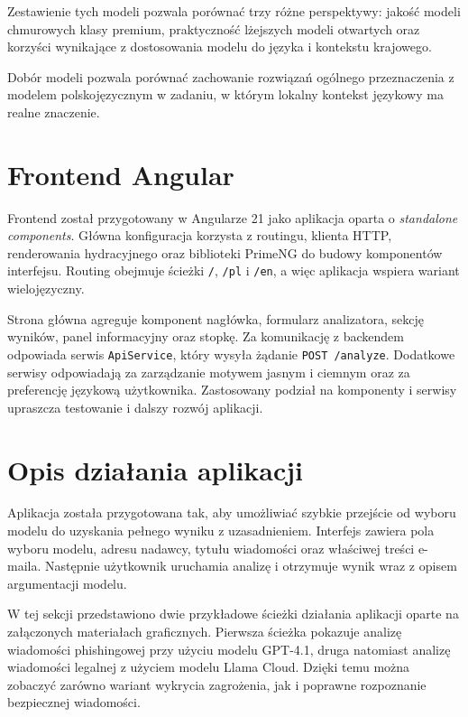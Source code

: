 \documentclass[12pt,a4paper,openany]{report}
\begin{document}
Zestawienie tych modeli pozwala porównać trzy różne perspektywy: jakość modeli chmurowych klasy premium, praktyczność lżejszych modeli otwartych oraz korzyści wynikające z dostosowania modelu do języka i kontekstu krajowego.

Dobór modeli pozwala porównać zachowanie rozwiązań ogólnego przeznaczenia z modelem polskojęzycznym w zadaniu, w którym lokalny kontekst językowy ma realne znaczenie.

\section{Frontend Angular}

Frontend został przygotowany w Angularze 21 jako aplikacja oparta o \textit{standalone components}. Główna konfiguracja korzysta z routingu, klienta HTTP, renderowania hydracyjnego oraz biblioteki PrimeNG do budowy komponentów interfejsu. Routing obejmuje ścieżki \texttt{/}, \texttt{/pl} i \texttt{/en}, a więc aplikacja wspiera wariant wielojęzyczny.

Strona główna agreguje komponent nagłówka, formularz analizatora, sekcję wyników, panel informacyjny oraz stopkę. Za komunikację z backendem odpowiada serwis \texttt{ApiService}, który wysyła żądanie \texttt{POST /analyze}. Dodatkowe serwisy odpowiadają za zarządzanie motywem jasnym i ciemnym oraz za preferencję językową użytkownika. Zastosowany podział na komponenty i serwisy upraszcza testowanie i dalszy rozwój aplikacji.

\section{Opis działania aplikacji}

Aplikacja została przygotowana tak, aby umożliwiać szybkie przejście od wyboru modelu do uzyskania pełnego wyniku z uzasadnieniem. Interfejs zawiera pola wyboru modelu, adresu nadawcy, tytułu wiadomości oraz właściwej treści e-maila. Następnie użytkownik uruchamia analizę i otrzymuje wynik wraz z opisem argumentacji modelu.

W tej sekcji przedstawiono dwie przykładowe ścieżki działania aplikacji oparte na załączonych materiałach graficznych. Pierwsza ścieżka pokazuje analizę wiadomości phishingowej przy użyciu modelu GPT-4.1, druga natomiast analizę wiadomości legalnej z użyciem modelu Llama Cloud. Dzięki temu można zobaczyć zarówno wariant wykrycia zagrożenia, jak i poprawne rozpoznanie bezpiecznej wiadomości.
\end{document}
